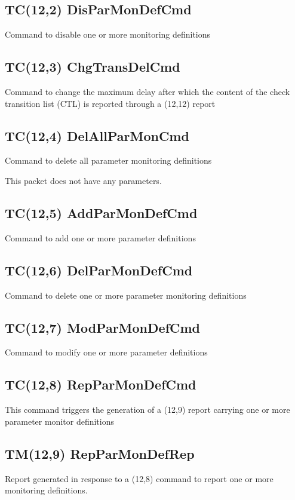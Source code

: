\pagebreak
\subsection{TC(12,2) DisParMonDefCmd}
Command to disable one or more monitoring definitions

\pagebreak
\subsection{TC(12,3) ChgTransDelCmd}
Command to change the maximum delay after which the content of the check transition list (CTL) is reported through a (12,12) report

\pagebreak
\subsection{TC(12,4) DelAllParMonCmd}
Command to delete all parameter monitoring definitions

This packet does not have any parameters.

\pagebreak
\subsection{TC(12,5) AddParMonDefCmd}
Command to add one or more parameter definitions

\pagebreak
\subsection{TC(12,6) DelParMonDefCmd}
Command to delete one or more parameter monitoring definitions

\pagebreak
\subsection{TC(12,7) ModParMonDefCmd}
Command to modify one or more parameter definitions

\pagebreak
\subsection{TC(12,8) RepParMonDefCmd}
This command triggers the generation of a (12,9) report carrying one or more parameter monitor definitions

\pagebreak
\subsection{TM(12,9) RepParMonDefRep}
Report generated in response to a (12,8) command to report one or more monitoring definitions.


